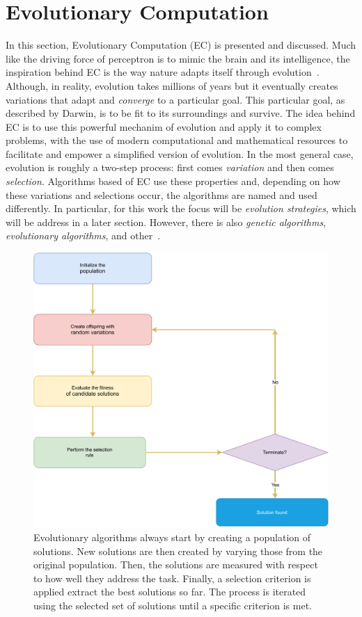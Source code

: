 \section{Evolutionary Computation}
In this section, Evolutionary Computation (EC) is presented and discussed. Much like the 
driving force of perceptron is to mimic the brain and its intelligence, the inspiration 
behind EC is the way nature adapts itself through 
evolution~\cite{fogelWhatEvolutionaryComputation2000}. Although, in reality, evolution 
takes millions of years but it eventually creates variations that adapt and \emph{converge} 
to a particular goal. This particular goal, as described by Darwin, is to be fit to its 
surroundings and survive. The idea behind EC is to use this powerful mechanim of evolution 
and apply it to complex problems, with the use of modern computational and mathematical 
resources to facilitate and empower a simplified version of evolution. In the most general 
case, evolution is roughly a two-step process: first comes \emph{variation} and then comes 
\emph{selection}. Algorithms based of EC use these properties and, depending on how these 
variations and selections occur, the algorithms are named and used differently. In 
particular, for this work the focus will be \emph{evolution strategies}, which will be 
address in a later section. However, there is also \emph{genetic algorithms}, 
\emph{evolutionary algorithms}, and other~\cite{kacprzykSpringerHandbookComputational2015}.

\begin{figure}
    \centering
    \includegraphics[scale=0.4]{figuras/capitulo-3/evolutionary-optimization.pdf}
    \caption{Evolutionary algorithms always start by creating a population of solutions. New solutions are then created by varying those from the original population. Then, the solutions are measured with respect to how well they address the task. Finally, a selection criterion is applied extract the best solutions so far. The process is iterated using the selected set of solutions until a specific criterion is met.}
    \label{fig:evolutionary-optimization}
\end{figure}

